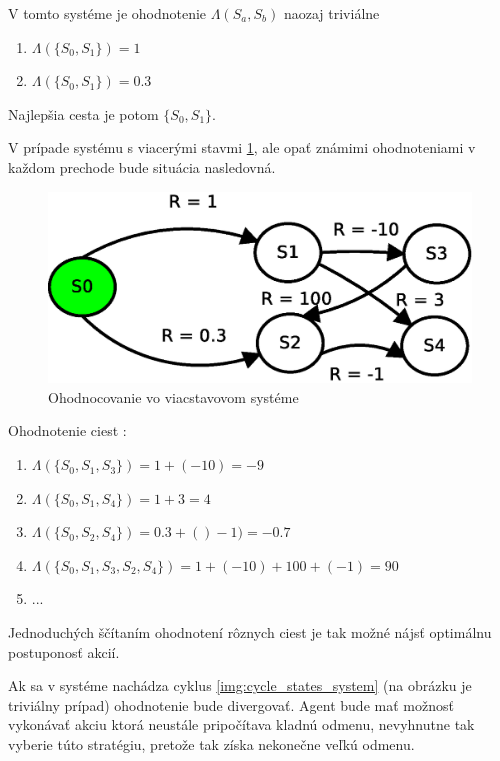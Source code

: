 V tomto systéme je ohodnotenie $\Lambda(S_a, S_b)$ naozaj triviálne

\begin{enumerate}
  \item $\Lambda(\{S_0, S_1\}) = 1$
  \item $\Lambda(\{S_0, S_1\}) = 0.3$
\end{enumerate}

Najlepšia cesta je potom $\{S_0, S_1\}$.

V prípade systému s viacerými stavmi \ref{img:multiple_states_system}, ale
opať známimi ohodnoteniami v každom prechode bude situácia nasledovná.

\begin{figure}[!htb]
\centering
\includegraphics[scale=.6]{../diagrams/rf_more_states.eps}
\caption{Ohodnocovanie vo viacstavovom systéme}
\label{img:multiple_states_system}
\end{figure}

Ohodnotenie ciest :
\begin{enumerate}
  \item $\Lambda(\{S_0, S_1, S_3\}) = 1+(-10) = -9$
  \item $\Lambda(\{S_0, S_1, S_4\}) = 1+3 = 4$
  \item $\Lambda(\{S_0, S_2, S_4\}) = 0.3 +()-1) =-0.7$
  \item $\Lambda(\{S_0, S_1, S_3, S_2, S_4\}) = 1 +(-10) +100 + (-1) = 90$
  \item ...
\end{enumerate}

Jednoduchých ščítaním ohodnotení rôznych ciest je tak možné nájsť optimálnu
postuponosť akcií.

Ak sa v systéme nachádza cyklus \ref{img:cycle_states_system} (na obrázku
je triviálny prípad) ohodnotenie bude divergovať. Agent bude mať možnosť
vykonávať akciu ktorá neustále pripočítava kladnú odmenu, nevyhnutne tak
vyberie túto stratégiu, pretože tak získa nekonečne veľkú odmenu.

